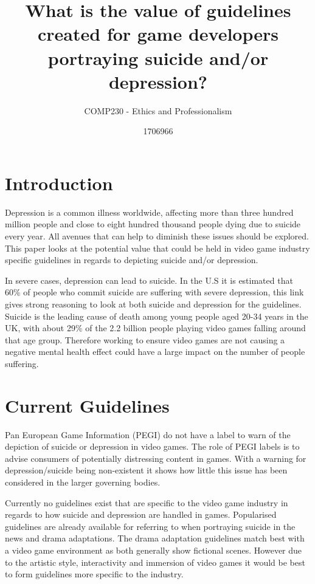 \documentclass{scrartcl}
\title{What is the value of guidelines created for game developers portraying suicide and/or depression?}
\subtitle{COMP230 - Ethics and Professionalism}
\author{1706966}
\begin{document}
	
	\maketitle
	
	\abstract{}
	
	\section{Introduction}
		Depression is a common illness worldwide, affecting more than three hundred million people and close to eight hundred thousand people dying due to suicide every year\cite{DepressionStats}. All avenues that can help to diminish these issues should be explored. This paper looks at the potential value that could be held in video game industry specific guidelines in regards to depicting suicide and/or depression.
		
		In severe cases, depression can lead to suicide. In the U.S it is estimated that 60\% of people who commit suicide are suffering with severe depression\cite{SuicideToDepression}, this link gives strong reasoning to look at both suicide and depression for the guidelines. Suicide is the leading cause of death among young people aged 20-34 years in the UK\cite{youngAge}, with about 29\%\cite{sales2018essential} of the 2.2 billion\cite{globalGame} people playing video games falling around that age group. Therefore working to ensure video games are not causing a negative mental health effect could have a large impact on the number of people suffering.
	
	\section{Current Guidelines}
		Pan European Game Information (PEGI) do not have a label to warn of the depiction of suicide or depression in video games\cite{pegiNoRating}. The role of PEGI labels is to advise consumers of potentially distressing content in games. With a warning for depression/suicide being non-existent it shows how little this issue has been considered in the larger governing bodies.
		
		Currently no guidelines exist that are specific to the video game industry in regards to how suicide and depression are handled in games. Popularised guidelines are already available for referring to when portraying suicide in the news\cite{world2017preventing,nepon2009media} and drama adaptations\cite{DramaGuidelines}.		
		The drama adaptation guidelines match best with a video game environment as both generally show fictional scenes. However due to the artistic style, interactivity and immersion of video games it would be best to form guidelines more specific to the industry. 	
\end{document}
